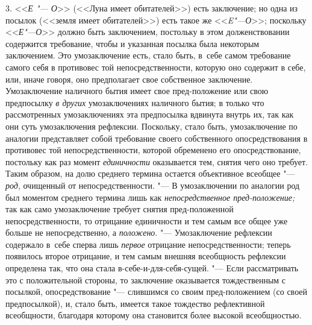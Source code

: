 3. <<{\em Е "--- О}>>
(<<Луна имеет обитателей>>) есть заключение; но одна из посылок
(<<земля имеет обитателей>>) есть такое же <<{\em E"---О}>>;
поскольку <<{\em Е"---О}>>
должно быть заключением, постольку в этом долженствовании
содержится требование, чтобы и указанная посылка была некоторым
заключением. Это умозаключение есть, стало быть, в~себе самом требование
самого себя в противовес той непосредственности, которую оно содержит в
себе, или, иначе говоря, оно предполагает свое собственное заключение.
Умозаключение наличного бытия имеет свое пред-положение или свою
предпосылку {\em в других}
умозаключениях наличного бытия; в только что
рассмотренных умозаключениях эта предпосылка вдвинута внутрь
их, так как они суть умозаключения рефлексии. Поскольку, стало быть,
умозаключение по аналогии представляет собой требование своего собственного
опосредствования в противовес той непосредственности, которой обременено
его опосредствование, постольку как раз момент
{\em единичности}
оказывается тем, снятия чего оно требует. Таким образом, на
долю среднего термина остается объективное всеобщее
"--- {\em род}, очищенный от
непосредственности. "--- В умозаключении по аналогии род был
моментом среднего термина лишь как
{\em непосредственное пред-положение;}
так как само умозаключение требует снятия пред-положенной
непосредственности, то отрицание единичности и тем самым все общее уже
больше не непосредственно, а
{\em положено}. "---
Умозаключение рефлексии содержало в~себе сперва лишь
{\em первое} отрицание
непосредственности; теперь появилось второе отрицание, и тем самым внешняя
всеобщность рефлексии определена так, что она стала
в-себе-и-для-себя-сущей. "--- Если рассматривать это с
положительной стороны, то заключение оказывается тождественным с посылкой,
опосредствование "--- слившимся со своим пред-положением (со
своей предпосылкой), и, стало быть, имеется такое тождество рефлективной
всеобщности, благодаря которому она становится более высокой
всеобщностью.

